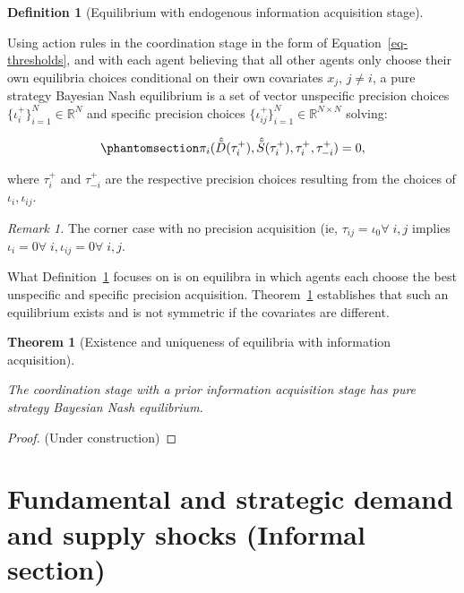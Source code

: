 \documentclass[
]{article}
\theoremstyle{definition}
\newtheorem{definition}{Definition}[section]
\theoremstyle{plain}
\newtheorem{theorem}{Theorem}[section]
\theoremstyle{remark}
\begin{document}
\begin{definition}[Equilibrium with endogenous information acquisition
stage]\protect\hypertarget{def-infoacquisition}{}\label{def-infoacquisition}

Using action rules in the coordination stage in the form of
Equation~\ref{eq-thresholds}, and with each agent believing that all
other agents only choose their own equilibria choices conditional on
their own covariates \(x_j\), \(j \neq i\), a pure strategy Bayesian
Nash equilibrium is a set of vector unspecific precision choices
\(\{\iota_i^{+}\}_{i=1}^N \in \mathbb{R}^N\) and specific precision
choices \(\{\iota_{ij}^{+}\}_{i=1}^N \in \mathbb{R}^{N \times N}\)
solving:

\begin{equation}\phantomsection\label{eq-BNE_infoacquis}{
\pi_i(\hat{\tilde{D}}(\tau_i^{+}), \hat{\tilde{S}}(\tau_i^{+}), \tau_i^{+}, \tau_{-i}^{+}) = 0,
}\end{equation}

where \(\tau_{i}^{+}\) and \(\tau_{-i}^{+}\) are the respective
precision choices resulting from the choices of \(\iota_i, \iota_{ij}\).

\emph{Remark 1.} The corner case with no precision acquisition (ie,
\(\tau_{ij} = \iota_0 \forall \; i, j\) implies
\(\iota_i = 0 \forall \; i, \iota_{ij} = 0 \forall \; i, j\).

\end{definition}

What Definition~\ref{def-infoacquisition} focuses on is on equilibra in
which agents each choose the best unspecific and specific precision
acquisition. Theorem~\ref{thm-infoacquisition} establishes that such an
equilibrium exists and is not symmetric if the covariates are different.

\begin{theorem}[Existence and uniqueness of equilibria with information
acquisition]\protect\hypertarget{thm-infoacquisition}{}\label{thm-infoacquisition}

The coordination stage with a prior information acquisition stage has
pure strategy Bayesian Nash equilibrium.

\end{theorem}

\begin{proof}
(Under construction)
\end{proof}

\section{Fundamental and strategic demand and supply shocks (Informal
section)}\label{fundamental-and-strategic-demand-and-supply-shocks-informal-section}
\end{document}
